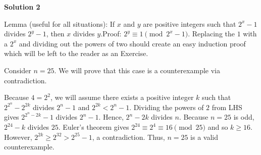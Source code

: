 \begin{enumerate}
 



\textbf{Solution 2}

Lemma (useful for all situations): If $x$ and $y$ are positive integers such that $2^x - 1$ divides $2^y - 1$, then $x$ divides $y$.Proof: $2^y \equiv 1 \pmod{2^x - 1}$. Replacing the $1$ with a $2^x$ and dividing out the powers of two should create an easy induction proof which will be left to the reader as an Exercise.

 Consider $n = 25$. We will prove that this case is a counterexample via contradiction.

 Because $4 = 2^2$, we will assume there exists a positive integer $k$ such that $2^{2^n} - 2^{2k}$ divides $2^n - 1$ and $2^{2k} < 2^n - 1$. Dividing the powers of $2$ from LHS gives $2^{2^n - 2k} - 1$ divides $2^n - 1$. Hence, $2^n - 2k$ divides $n$. Because $n = 25$ is odd, $2^{24} - k$ divides $25$. Euler's theorem gives $2^{24} \equiv 2^4 \equiv 16 \pmod{25}$ and so $k \ge 16$. However, $2^{2k} \geq 2^{32} > 2^{25} - 1$, a contradiction. Thus, $n = 25$ is a valid counterexample.

 


\end{enumerate}
